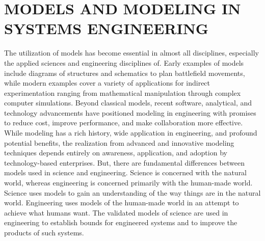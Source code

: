 \chapter{MODELS AND MODELING IN SYSTEMS ENGINEERING}\label{chap:07}

The utilization of models has become essential in almost all disciplines, especially the applied sciences and engineering disciplines of. Early examples of models include diagrams of structures and schematics to plan battlefield movements, while modern examples cover a variety of applications for indirect experimentation ranging from mathematical manipulation through complex computer simulations.
Beyond classical models, recent software, analytical, and technology advancements have positioned modeling in engineering with promises to reduce cost, improve performance, and make collaboration more effective. While modeling has a rich history, wide application in engineering, and profound potential benefits, the realization from advanced and innovative modeling techniques depends entirely on awareness, application, and adoption by technology-based enterprises.
But, there are fundamental differences between models used in science and engineering. Science is concerned with the natural world, whereas engineering is concerned primarily with the human-made world. Science uses models to gain an understanding of the way things are in the natural world. Engineering uses models of the human-made world in an attempt to achieve what humans want. The validated models of science are used in engineering to establish bounds for engineered systems and to improve the products of such systems.


















